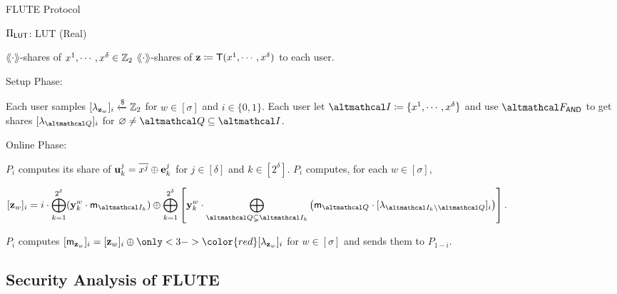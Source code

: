 \documentclass[../240906_cryptlab_flute.tex]{subfiles}
\begin{document}
\begin{frame}{FLUTE Protocol}
    \def\onlyred{\only<3->{\color{red}}}
    \begin{block}{\(\Pi_{\mathsf{LUT}}\): LUT (Real)}
        \begin{description}[Output]
            \ii[Input]
            \(\lang\cdot\rang\)-shares of \(x^1, \cdots, x^\delta \in \mathbb{Z}_2\)
            \ii[Output]
            \(\lang\cdot\rang\)-shares of \(\mathbf{z} \coloneqq \mathsf{T}(x^1, \cdots, x^\delta)\) to each
            user.
        \end{description}
        \footnotesize
        \pause
        Setup Phase:
        \begin{enumerate}
            \ii
            \normalsize
            Each user samples {\onlyred\([\lambda_{\mathbf{z}_w}]_i \xleftarrow{\$} \mathbb{Z}_2\)} for \(w \in [\sigma]\)
            and \(i \in \{0,1\}\).
            \ii
            Each user let \(\mcal{I} \coloneqq \{x^1, \cdots, x^\delta\}\)
            and use \(\mcal{F}_\msf{AND}\)
            to get shares \([\lambda_{\mcal{Q}}]_i\) for \(\OO \neq \mcal{Q} \subseteq \mcal{I}\).
        \end{enumerate}
        \pause
        \footnotesize
        Online Phase:
        \begin{enumerate}
            \footnotesize
            \color{gray}
            \ii
            \(P_i\) computes its share of \(\boldsymbol{\mathbf{u}}^j_k = \overline{x^j} \oplus \boldsymbol{\mathbf{e}}^j_k\)
            for \(j \in [\delta]\) and \(k \in [2^\delta]\).
            \ii
            \(P_i\) computes, for each \(w \in [\sigma]\),
            \centerline{%
                \(\displaystyle
                [\vec{z}_w]_i = i \cdot \bigoplus_{k=1}^{2^\delta} (\vec{y}^w_k \cdot \msf{m}_{\mcal{I}_k})
                \oplus \bigoplus_{k=1}^{2^\delta} \left[
                    \vec{y}^w_k \cdot \bigoplus_{\mcal{Q} \subsetneq \mcal{I}_k} \big(
                    \msf{m}_{\mcal{Q}} \cdot [\lambda_{\mcal{I}_k \setminus \mcal{Q}}]_i \big)
                \right].
                \)
            }
            \ii
            \normalsize
            \color{black}
            \(P_i\) computes \([\msf{m}_{\vec{z}_w}]_i = [\vec{z}_w]_i \oplus {\onlyred[\lambda_{\vec{z}_w}]_i}\)
            for \(w \in [\sigma]\) and sends them to \(P_{1-i}\).
        \end{enumerate}
    \end{block}
\end{frame}

\subsection{Security Analysis of FLUTE}
\end{document}
